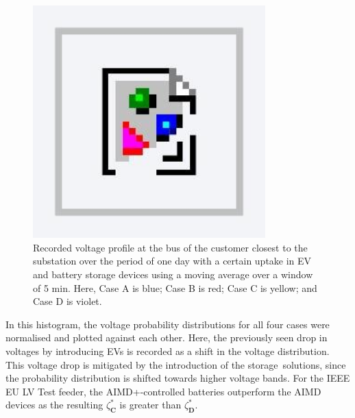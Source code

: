 \begin{figure}\centering
 \includegraphics[width=0.8\textwidth]{foo}
 \caption{Recorded voltage profile at the bus of the customer closest to the substation over the period of one day with a certain uptake in EV and battery storage devices using a moving average over a window of 5 min. Here, Case {A} is blue; Case {B} is red; Case {C} is yellow; and Case {D} is violet.}
 \label{fig-voltage-profiles-excerpt}
\end{figure}

In this histogram, the voltage probability distributions for all four cases were normalised and plotted against each other. Here, the previously seen drop in voltages by introducing EVs is recorded as a shift in the voltage distribution. This voltage drop is mitigated by the introduction of the storage~solutions, since the probability distribution is shifted towards higher voltage bands. For the IEEE EU LV Test feeder, the AIMD+-controlled batteries outperform the AIMD devices as the resulting $\zeta_\textbf{C}^{*}$ is greater than $\zeta_\textbf{D}^{*}$.

